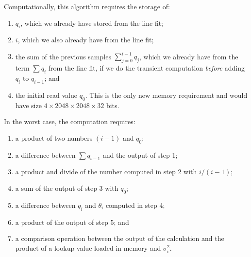 \documentclass{ws-jai}
\begin{document}
Computationally, this algorithm requires the storage of:
%
\begin{enumerate}
\item $q_{i}$, which we already have stored from the line fit;
\item $i$, which we also already have from the line fit;
\item the sum of the previous samples $\sum_{j=0}^{i-1} q_{j} $, which we
  already have from the term $\sum q_{i}$ from the line fit, if
  we do the transient computation \emph{before} adding $q_{i}$ to
  $q_{i-1}$; and
\item the initial read value $q_{0}$.  This is the only new memory
  requirement and would have size $4 \times 2048 \times 2048 \times
  32$ bits.
\end{enumerate}
%
In the worst case, the computation requires:
%
\begin{enumerate}
\item a product of two numbers $(i-1)$ and $q_{0}$;
\item a difference between $\sum q_{i-1}$ and the output of step 1;
\item a product and divide of the number computed in step 2 with $i/(i-1)$;
\item a sum of the output of step 3 with $q_{0}$;
\item a difference between $q_{i}$ and $\theta_{i}$ computed in step 4;
\item a product of the output of step 5; and
\item a comparison operation between the output of the calculation and
  the product of a lookup value loaded in memory and $\sigma_{i}^{2}$.
\end{enumerate}
\end{document}
